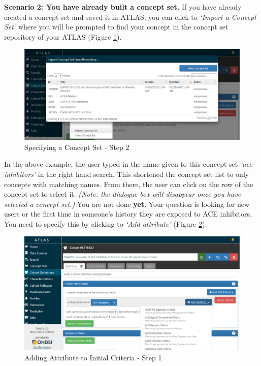 \documentclass[11pt]{book}
\theoremstyle{definition}
\theoremstyle{definition}
\theoremstyle{definition}
\theoremstyle{remark}
\begin{document}
\textbf{Scenario 2: You have already built a concept set.} If you have already created a concept set and saved it in ATLAS, you can click to \emph{`Import a Concept Set'} where you will be prompted to find your concept in the concept set repository of your ATLAS (Figure \ref{fig:ATLASfindyourconcept}).

\begin{figure}

{\centering \includegraphics[width=0.9\linewidth]{images/Cohorts/ATLAS-findingyourconcept} 

}

\caption{Specifying a Concept Set - Step 2}\label{fig:ATLASfindyourconcept}
\end{figure}

In the above example, the user typed in the name given to this concept set \emph{`ace inhibitors'} in the right hand search. This shortened the concept set list to only concepts with matching names. From there, the user can click on the row of the concept set to select it. \emph{(Note: the dialogue box will disappear once you have selected a concept set.)} You are not done \textbf{yet}. Your question is looking for new users or the first time in someone's history they are exposed to ACE inhibitors. You need to specify this by clicking to \emph{`Add attribute'} (Figure \ref{fig:ATLASfirstexposure}).

\begin{figure}

{\centering \includegraphics[width=0.9\linewidth]{images/Cohorts/ATLAS-firstexposure} 

}

\caption{Adding Attribute to Initial Criteria - Step 1}\label{fig:ATLASfirstexposure}
\end{figure}
\end{document}
